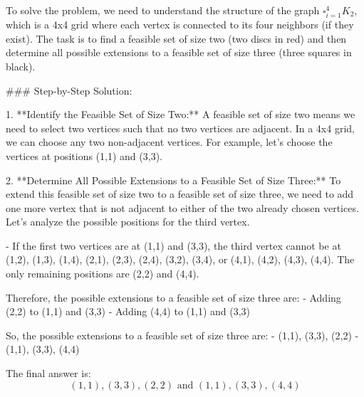 To solve the problem, we need to understand the structure of the graph \( \square_{i=1}^4 K_2 \), which is a 4x4 grid where each vertex is connected to its four neighbors (if they exist). The task is to find a feasible set of size two (two discs in red) and then determine all possible extensions to a feasible set of size three (three squares in black).

### Step-by-Step Solution:

1. **Identify the Feasible Set of Size Two:**
   A feasible set of size two means we need to select two vertices such that no two vertices are adjacent. In a 4x4 grid, we can choose any two non-adjacent vertices. For example, let's choose the vertices at positions (1,1) and (3,3).

2. **Determine All Possible Extensions to a Feasible Set of Size Three:**
   To extend this feasible set of size two to a feasible set of size three, we need to add one more vertex that is not adjacent to either of the two already chosen vertices. Let's analyze the possible positions for the third vertex.

   - If the first two vertices are at (1,1) and (3,3), the third vertex cannot be at (1,2), (1,3), (1,4), (2,1), (2,3), (2,4), (3,2), (3,4), or (4,1), (4,2), (4,3), (4,4). The only remaining positions are (2,2) and (4,4).

   Therefore, the possible extensions to a feasible set of size three are:
   - Adding (2,2) to (1,1) and (3,3)
   - Adding (4,4) to (1,1) and (3,3)

So, the possible extensions to a feasible set of size three are:
- (1,1), (3,3), (2,2)
- (1,1), (3,3), (4,4)

The final answer is:
\[
\boxed{(1,1), (3,3), (2,2) \text{ and } (1,1), (3,3), (4,4)}
\]